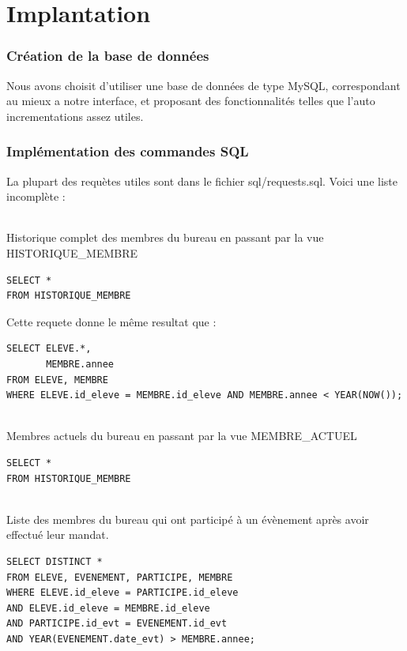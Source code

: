 \documentclass[a4paper, 11pt]{article}
\begin{document}
\newpage
\part{Implantation}
\setcounter{section}{0}
\section{Création de la base de données}
Nous avons choisit d'utiliser une base de données de type MySQL, correspondant au mieux a notre interface, et proposant des fonctionnalités telles que l'auto incrementations assez utiles.

\section{Implémentation des commandes SQL}
La plupart des requètes utiles sont dans le fichier sql/requests.sql. Voici une liste incomplète :
\paragraph{}
Historique complet des membres du bureau en passant par la vue HISTORIQUE\_MEMBRE
\begin{verbatim}
SELECT *
FROM HISTORIQUE_MEMBRE
\end{verbatim}
Cette requete donne le même resultat que :
\begin{verbatim}
SELECT ELEVE.*,
       MEMBRE.annee
FROM ELEVE, MEMBRE 
WHERE ELEVE.id_eleve = MEMBRE.id_eleve AND MEMBRE.annee < YEAR(NOW());
\end{verbatim}
\paragraph{}
Membres actuels du bureau en passant par la vue MEMBRE\_ACTUEL
\begin{verbatim}
SELECT *
FROM HISTORIQUE_MEMBRE
\end{verbatim}
\paragraph{}
Liste des membres du bureau qui ont participé à un évènement après avoir effectué leur mandat.
\begin{verbatim}
SELECT DISTINCT *
FROM ELEVE, EVENEMENT, PARTICIPE, MEMBRE
WHERE ELEVE.id_eleve = PARTICIPE.id_eleve
AND ELEVE.id_eleve = MEMBRE.id_eleve
AND PARTICIPE.id_evt = EVENEMENT.id_evt
AND YEAR(EVENEMENT.date_evt) > MEMBRE.annee;
\end{verbatim}
\end{document}
